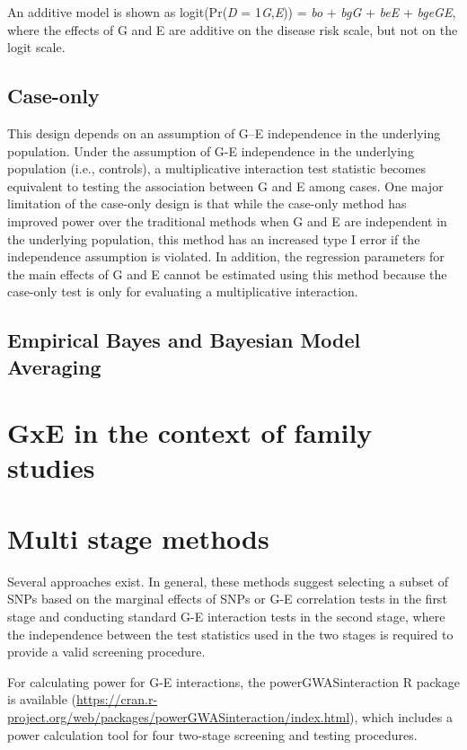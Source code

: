 \documentclass[]{book}
\theoremstyle{definition}
\theoremstyle{definition}
\theoremstyle{definition}
\theoremstyle{remark}
\begin{document}
An additive model is shown as logit(Pr(\emph{D} =
1\textbar{}\emph{G},\emph{E})) = \emph{bo} + \emph{bgG} + \emph{beE} +
\emph{bgeGE}, where the effects of G and E are additive on the disease
risk scale, but not on the logit scale.

\subsection{Case-only}\label{case-only}

This design depends on an assumption of G--E independence in the
underlying population. Under the assumption of G-E independence in the
underlying population (i.e., controls), a multiplicative interaction
test statistic becomes equivalent to testing the association between G
and E among cases. One major limitation of the case-only design is that
while the case-only method has improved power over the traditional
methods when G and E are independent in the underlying population, this
method has an increased type I error if the independence assumption is
violated. In addition, the regression parameters for the main effects of
G and E cannot be estimated using this method because the case-only test
is only for evaluating a multiplicative interaction.

\subsection{Empirical Bayes and Bayesian Model
Averaging}\label{empirical-bayes-and-bayesian-model-averaging}

\section{GxE in the context of family
studies}\label{gxe-in-the-context-of-family-studies}

\section{Multi stage methods}\label{multi-stage-methods}

Several approaches exist. In general, these methods suggest selecting a
subset of SNPs based on the marginal effects of SNPs or G-E correlation
tests in the first stage and conducting standard G-E interaction tests
in the second stage, where the independence between the test statistics
used in the two stages is required to provide a valid screening
procedure.

For calculating power for G-E interactions, the powerGWASinteraction R
package is available
(\url{https://cran.r-project.org/web/packages/powerGWASinteraction/index.html}),
which includes a power calculation tool for four two-stage screening and
testing procedures.
\end{document}
